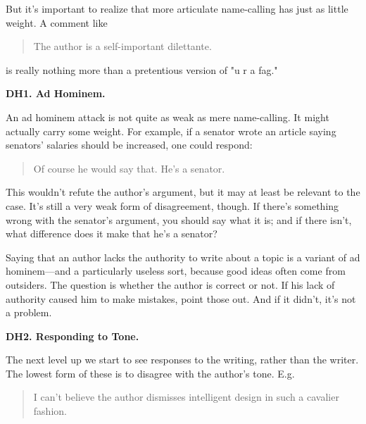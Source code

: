                   But it's important to realize that more articulate
                  name-calling has just as little weight. A comment like
                  \begin{quote}

                    The author is a self-important dilettante.
                  
\end{quote}

                  is really nothing more than a pretentious version of "u r a
                  fag."


                  \textbf{DH1. Ad Hominem.}

An ad hominem attack is not
                  quite as weak as mere name-calling. It might actually carry
                  some weight. For example, if a senator wrote an article saying
                  senators' salaries should be increased, one could respond:
                  \begin{quote}

                    Of course he would say that. He's a senator.
                  
\end{quote}

                  This wouldn't refute the author's argument, but it may at
                  least be relevant to the case. It's still a very weak form of
                  disagreement, though. If there's something wrong with the
                  senator's argument, you should say what it is; and if there
                  isn't, what difference does it make that he's a senator?

Saying
                  that an author lacks the authority to write about a topic is a
                  variant of ad hominem---and a particularly useless sort,
                  because good ideas often come from outsiders. The question is
                  whether the author is correct or not. If his lack of authority
                  caused him to make mistakes, point those out. And if it
                  didn't, it's not a problem.


                  \textbf{DH2. Responding to Tone.}

The next level up
                  we start to see responses to the writing, rather than the
                  writer. The lowest form of these is to disagree with the
                  author's tone. E.g.
                  \begin{quote}

                    I can't believe the author dismisses intelligent design in
                    such a cavalier fashion.
                  
\end{quote}

